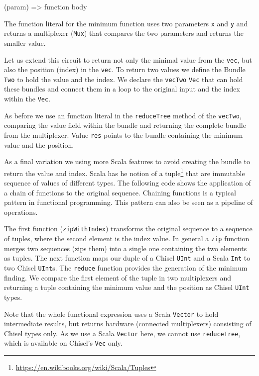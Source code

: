 \documentclass[%
    10pt,
    headinclude, footexclude,
    openright, %
    notitlepage,
    cleardoubleempty,
    headsepline,
    pointlessnumbers,
    bibtotoc, idxtotoc,
    ]{scrbook}
\newcommand{\code}[1]{{\small{\texttt{#1}}}}
\newcommand{\myref}[2]{\href{#1}{#2}}
\renewcommand{\myref}[2]{{#2}{\footnote{\url{#1}}}}
\begin{document}
\begin{chisel}
  (param) => function body
\end{chisel}

\noindent The function literal for the minimum function uses two parameters \code{x} and \code{y}
and returns a multiplexer (\code{Mux}) that compares the two parameters and returns the smaller
value.


Let us extend this circuit to return not only the minimal value from the \code{vec}, but also the
position (index) in the \code{vec}. To return two values we define the Bundle \code{Two} to
hold the value and the index. We declare the \code{vecTwo} \code{Vec} that can hold these bundles
and connect them in a loop to the original input and the index within the \code{Vec}.

As before we use an function literal in the \code{reduceTree} method of the \code{vecTwo},
comparing the value field within the bundle and returning the complete bundle from the multiplexer.
Value \code{res} points to the bundle containing the minimum value and the position.


As a final variation we using more Scala features to avoid creating the bundle to return the value
and index. Scala has he notion of a \myref{https://en.wikibooks.org/wiki/Scala/Tuples}{tuple}
that are immutable sequence of values of different types. The following code shows the application
of a chain of functions to the original sequence. Chaining functions is a typical pattern in functional programming.
This pattern can also be seen as a pipeline of operations.

The first function (\code{zipWithIndex})
transforms the original sequence to a sequence of tuples, where the second element is the index
value. In general a \code{zip} function merges two sequences (zips them) into a single one
containing the two elements as tuples. The next function maps our duple of a Chisel \code{UInt}
and a Scala \code{Int} to two Chisel \code{UInt}s. The \code{reduce} function provides the generation of
the minimum finding. We compare the first element of the tuple in two multiplexers and returning
a tuple containing the minimum value and the position as Chisel \code{UInt} types.


Note that the whole functional expression uses a Scala \code{Vector} to hold intermediate results,
but returns hardware (connected multiplexers) consisting of Chisel types only.
As we use a Scala \code{Vector} here, we cannot use \code{reduceTree}, which is available on Chisel's
\code{Vec} only.
 
\end{document}
